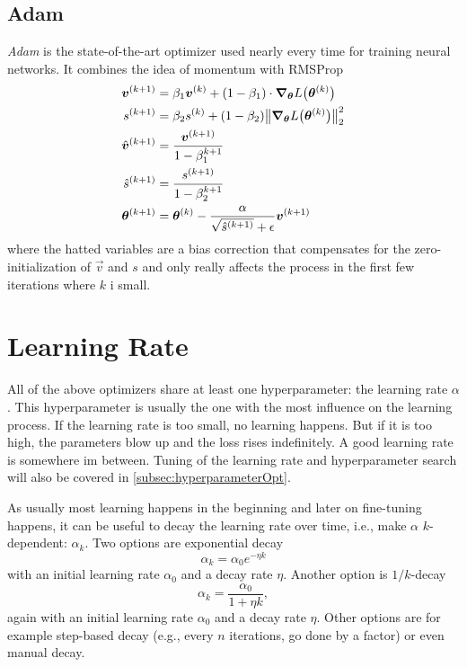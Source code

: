 		\subsection{Adam}
			\emph{Adam} is the state-of-the-art optimizer used nearly every time for training neural networks. It combines the idea of momentum with RMSProp
			\begin{align}
				\bm{v}^{(k + 1)} &= \beta_1 \bm{v}^{(k)} + (1 - \beta_1) \cdot \grad_{\bm{\theta}} L\bigl(\bm{\theta}^{(k)}\bigr) \\
				s^{(k + 1)} &= \beta_2 s^{(k)} + (1 - \beta_2) \big\lVert \grad_{\bm{\theta}} L\bigl(\bm{\theta}^{(k)}\bigr) \big\rVert_2^2 \\
				\hat{\bm{v}}^{(k + 1)} &= \frac{\bm{v}^{(k + 1)}}{1 - \beta_1^{k + 1}} \\
				\hat{s}^{(k + 1)} &= \frac{s^{(k + 1)}}{1 - \beta_2^{k + 1}} \\
				\bm{\theta}^{(k + 1)} &= \bm{\theta}^{(k)} - \frac{\alpha}{\sqrt{\hat{s}^{(k + 1)}} + \epsilon} \bm{v}^{(k + 1)}
			\end{align}
			where the hatted variables are a bias correction that compensates for the zero-initialization of \(\vec{v}\) and \(s\) and only really affects the process in the first few iterations where \(k\) i small.

	\section{Learning Rate}
		All of the above optimizers share at least one hyperparameter: the learning rate \(\alpha\). This hyperparameter is usually the one with the most influence on the learning process. If the learning rate is too small, no learning happens. But if it is too high, the parameters blow up and the loss rises indefinitely. A good learning rate is somewhere im between. Tuning of the learning rate and hyperparameter search will also be covered in \autoref{subsec:hyperparameterOpt}.

		As usually most learning happens in the beginning and later on fine-tuning happens, it can be useful to decay the learning rate over time, i.e., make \(\alpha\) \(k\)-dependent: \(\alpha_k\). Two options are exponential decay
		\begin{equation}
			\alpha_k = \alpha_0 e^{-\eta k}
		\end{equation}
		with an initial learning rate \(\alpha_0\) and a decay rate \(\eta\). Another option is \(1/k\)-decay
		\begin{equation}
			\alpha_k = \frac{\alpha_0}{1 + \eta k},
		\end{equation}
		again with an initial learning rate \(\alpha_0\) and a decay rate \(\eta\). Other options are for example step-based decay (e.g., every \(n\) iterations, go done by a factor) or even manual decay.

